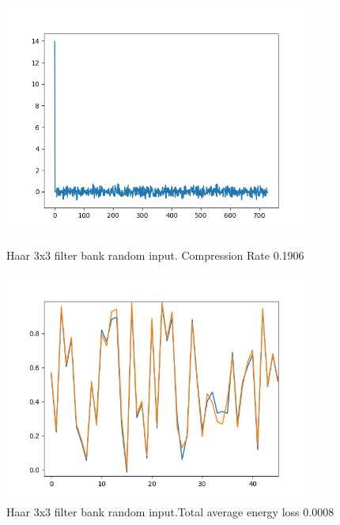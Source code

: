 \documentclass{article}
\theoremstyle{definition} %
\begin{document}
\begin{figure}[ht!]
    \centering
    \begin{minipage}{0.45\textwidth}
        \centering
        \includegraphics[width=0.9\textwidth]{fig/Haar3Augmented1D_freq.png} %
        \caption{Haar 3x3 filter bank random input. Compression Rate 0.1906}
        \label{fig:Haar3}
    \end{minipage}\hfill
    \begin{minipage}{0.45\textwidth}
        \centering
        \includegraphics[width=0.9\textwidth]{fig/Haar3Augmented1D_rec.png} %
        \caption{Haar 3x3 filter bank random input.Total average energy loss 0.0008}
    \end{minipage}
\end{figure}
\end{document}
